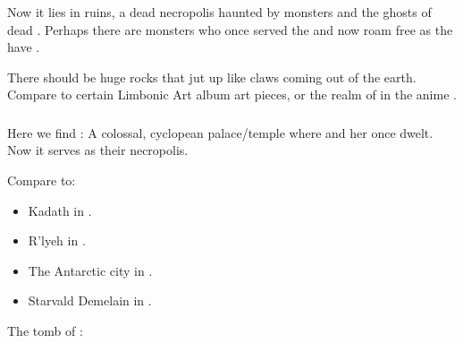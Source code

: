 Now it lies in ruins, a dead necropolis haunted by monsters and the ghosts of dead \dragons. 
Perhaps there are monsters who once served the \dragons{} and now roam free as the \dragons{} have . 

There should be huge rocks that jut up like claws coming out of the earth. 
Compare to certain Limbonic Art album art pieces, or the realm of \Juujinkai{} in the anime \emph{\Urotsukidouji}. 





\subsubsection{\Dathka}
Here we find \Dathka: 
A colossal, cyclopean palace/temple where \Tiamat{} and her \firstgendragons{} once dwelt. 
Now it serves as their necropolis. 

Compare to:

\begin{itemize}
  \item Kadath in \cite{HPLovecraft:TheDreamQuestofUnknownKadath}.
  \item R'lyeh in \cite{HPLovecraft:TheCallofCthulhu}. 
  \item The Antarctic city in \cite{HPLovecraft:AttheMountainsofMadness}. 
  \item Starvald Demelain in \cite{StevenErikson:ReapersGale}. 
\end{itemize}


The tomb of \Sethicus: 

